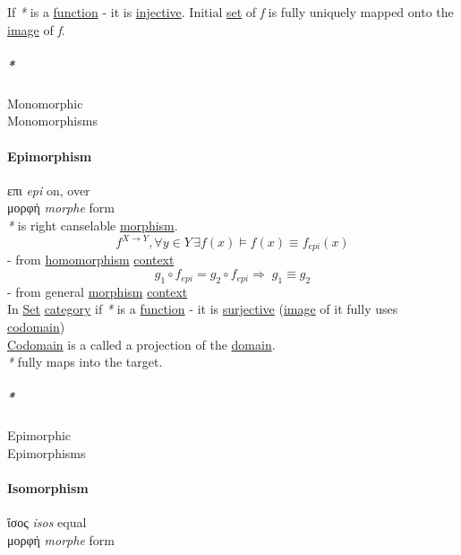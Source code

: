 \documentclass[11pt]{article}
\begin{document}
If \emph{*} is a \hyperref[orge15bc14]{function} - it is \hyperref[org51366e0]{injective}. Initial \hyperref[org1faf06d]{set} of \emph{f} is fully uniquely mapped onto the \hyperref[orgef20814]{image} of \emph{f}.\\

\subparagraph{\emph{*}}
\label{sec:org8fcda38}

\label{orgc646917}Monomorphic\\
\label{orgb4eb8ed}Monomorphisms\\

\paragraph{\label{orgb5de842}Epimorphism}
\label{sec:org27ca769}
επι \emph{epi} on, over\\
μορφή \emph{morphe} form\\

\emph{*} is right canselable \hyperref[org5de09d4]{morphism}.\\
$$ f^{X \to Y}, \forall y \in Y \, \exists f(x) \vDash f(x) \equiv f_{epi}(x) $$ - from \hyperref[org4991058]{homomorphism} \hyperref[org2ec7d4f]{context}\\
$$ g_1 \circ f_{epi} = g_2 \circ f_{epi} \Rightarrow \; g_1 \equiv g_2 $$ - from general \hyperref[org5de09d4]{morphism} \hyperref[org2ec7d4f]{context}\\

In \hyperref[org1faf06d]{Set} \hyperref[org0450535]{category} if \emph{*} is a \hyperref[orge15bc14]{function} - it is \hyperref[org6e4e05d]{surjective} (\hyperref[orgef20814]{image} of it fully uses \hyperref[org410079d]{codomain})\\
\hyperref[org410079d]{Codomain} is a called a projection of the \hyperref[org494b48a]{domain}.\\

\emph{*} fully maps into the target.\\

\subparagraph{\emph{*}}
\label{sec:org4b768f3}

\label{org9dd66ea}Epimorphic\\
\label{orgd8e0403}Epimorphisms\\

\paragraph{\label{org91df03a}Isomorphism}
\label{sec:orgcaf5722}
ἴσος \emph{isos} equal\\
μορφή \emph{morphe} form\\
\end{document}
